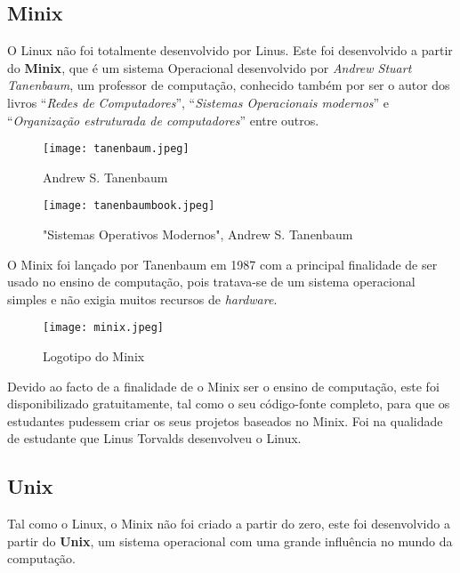 \documentclass{report}
\begin{document}
\subsection{Minix}

O Linux não foi totalmente desenvolvido por Linus. Este foi desenvolvido a partir do \textbf{Minix}, que é um sistema Operacional desenvolvido por \textit{Andrew Stuart Tanenbaum}, um professor de computação, conhecido também por ser o autor dos livros “\textit{Redes de Computadores}”, “\textit{Sistemas Operacionais modernos}” e “\textit{Organização estruturada de computadores}” entre outros.

\begin{figure}[h!]
    \centering
    \texttt{[image: tanenbaum.jpeg]}
    \caption{Andrew S. Tanenbaum}
\end{figure}

\begin{figure}[h!]
    \centering
    \texttt{[image: tanenbaumbook.jpeg]}
    \caption{"Sistemas Operativos Modernos", Andrew S. Tanenbaum}
\end{figure}

O Minix foi lançado por Tanenbaum em 1987 com a principal finalidade de ser usado no ensino de computação, pois tratava-se de um sistema operacional simples e não exigia muitos recursos de \textit{hardware}.



\begin{figure}[h!]
    \centering
    \texttt{[image: minix.jpeg]}
    \caption{Logotipo do Minix}
\end{figure}

Devido ao facto de a finalidade de o Minix ser o ensino de computação, este foi disponibilizado gratuitamente, tal como o seu código-fonte completo, para que os estudantes pudessem criar os seus projetos baseados no Minix. Foi na qualidade de estudante que Linus Torvalds desenvolveu o Linux.

\subsection{Unix}

Tal como o Linux, o Minix não foi criado a partir do zero, este foi desenvolvido a partir do \textbf{Unix}, um sistema operacional com uma grande influência no mundo da computação.

\vspace{5mm}
\end{document}
